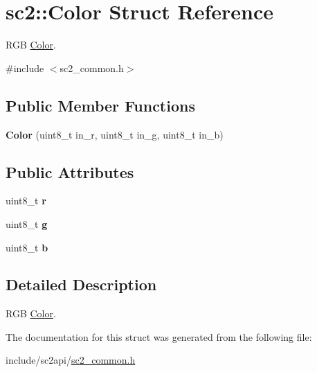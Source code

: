 \hypertarget{structsc2_1_1_color}{}\section{sc2\+:\+:Color Struct Reference}
\label{structsc2_1_1_color}


R\+GB \hyperlink{structsc2_1_1_color}{Color}.  




{\ttfamily \#include $<$sc2\+\_\+common.\+h$>$}

\subsection*{Public Member Functions}
\begin{DoxyCompactItemize}
\item 
\mbox{\label{structsc2_1_1_color_a58a800974f0282ba6c0546c066de81d5}} 
{\bfseries Color} (uint8\+\_\+t in\+\_\+r, uint8\+\_\+t in\+\_\+g, uint8\+\_\+t in\+\_\+b)
\end{DoxyCompactItemize}
\subsection*{Public Attributes}
\begin{DoxyCompactItemize}
\item 
\mbox{\label{structsc2_1_1_color_a93be47b4a56bf06fd75d5f32111e65ca}} 
uint8\+\_\+t {\bfseries r}
\item 
\mbox{\label{structsc2_1_1_color_a03ec2e00a882699d2db7ee00c4efdcae}} 
uint8\+\_\+t {\bfseries g}
\item 
\mbox{\label{structsc2_1_1_color_a246688d8f256aa999c2de0f9314970a7}} 
uint8\+\_\+t {\bfseries b}
\end{DoxyCompactItemize}


\subsection{Detailed Description}
R\+GB \hyperlink{structsc2_1_1_color}{Color}. 

The documentation for this struct was generated from the following file\+:\begin{DoxyCompactItemize}
\item 
include/sc2api/\hyperlink{sc2__common_8h}{sc2\+\_\+common.\+h}\end{DoxyCompactItemize}

